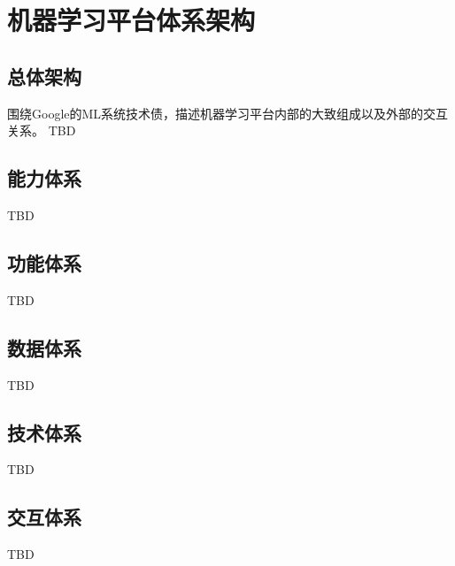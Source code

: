 
\chapter{机器学习平台体系架构}

\section{总体架构}

围绕Google的ML系统技术债，描述机器学习平台内部的大致组成以及外部的交互关系。
TBD


\section{能力体系}

TBD


\section{功能体系}

TBD


\section{数据体系}

TBD


\section{技术体系}

TBD


\section{交互体系}

TBD
